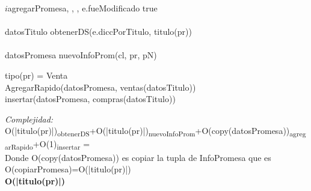 			
 \begin{algorithm}{$i$agregarPromesa}{, , , }{}
 			e.fueModificado \leftarrow true \\
 			 \\
 			datosTitulo \leftarrow obtenerDS(e.diccPorTitulo, titulo(pr))\\
 			 \\
 			datosPromesa \leftarrow nuevoInfoProm(cl, pr, pN) \\ 			
 			\begin{IF}{tipo(pr) = Venta} \\
 			AgregarRapido(datosPromesa, ventas(datosTitulo))
			\ELSE \\
			insertar(datosPromesa, compras(datosTitulo))
			\end{IF} 
 			\end{algorithm}
		\textit{Complejidad:}  \\
		
		O(|titulo(pr)|)\textsubscript{obtenerDS}+O(|titulo(pr)|)\textsubscript{nuevoInfoProm}+O(copy(datosPromesa))\textsubscript{agregarRapido}+O(1)\textsubscript{insertar} = \\
		 Donde O(copy(datosPromesa)) es copiar la tupla de InfoPromesa que es O(copiarPromesa)=O(|titulo(pr)|) \\
		 \textbf{O(|titulo(pr)|)}\\	

